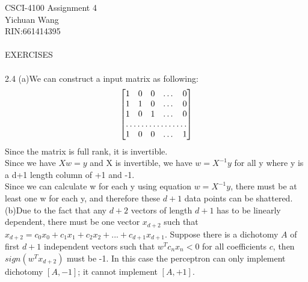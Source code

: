 \documentclass[12pt]{article}
\begin{document}
CSCI-4100 Assignment 4\\
Yichuan Wang \\
RIN:661414395\\\\

EXERCISES\\\\
2.4
(a)We can construct a input matrix as following:
\[
\begin{bmatrix}
    1       & 0 & 0 & \dots & 0 \\
    1       & 1 & 0 & \dots & 0 \\
    1       & 0 & 1 & \dots & 0 \\
    \hdotsfor{5} \\
    1       & 0 & 0 & \dots & 1
\end{bmatrix}
\]
Since the matrix is full rank, it is invertible.\\
Since we have $Xw = y$ and X is invertible, we have $w=X^{-1}y$ for all y where y is a d+1 length column of +1 and -1.\\ 
Since we can calculate w for each y using equation $w=X^{-1}y$, there must be at least one w for each y, and therefore these $d+1$ data points can be shattered.\\ 
(b)Due to the fact that any $d+2$ vectors of length $d+1$ has to be linearly dependent, there must be one vector $x_{d+2}$ such that $x_{d+2}=c_0x_0+c_1x_1+c_2x_2+...+c_{d+1}x_{d+1}$. Suppose there is a dichotomy $A$ of first $d+1$ independent vectors such that $w^Tc_nx_n<0$ for all coefficients $c$, then $sign(w^Tx_{d+2})$ must be -1. In this case the perceptron can only implement dichotomy $[A,-1]$; it cannot implement $[A,+1]$.\\  
\end{document}

